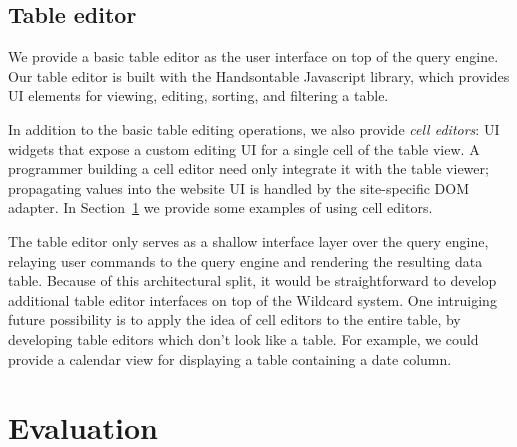 \documentclass[sigplan,screen,10pt,anonymous,review]{acmart}
\begin{document}
\hypertarget{table-editor}{%
\subsection{Table editor}\label{table-editor}}

We provide a basic table editor as the user interface on top of the
query engine. Our table editor is built with the Handsontable Javascript
library, which provides UI elements for viewing, editing, sorting, and
filtering a table.

In addition to the basic table editing operations, we also provide
\emph{cell editors}: UI widgets that expose a custom editing UI for a
single cell of the table view. A programmer building a cell editor need
only integrate it with the table viewer; propagating values into the
website UI is handled by the site-specific DOM adapter. In
Section~\ref{sec:evaluation} we provide some examples of using cell
editors.

The table editor only serves as a shallow interface layer over the query
engine, relaying user commands to the query engine and rendering the
resulting data table. Because of this architectural split, it would be
straightforward to develop additional table editor interfaces on top of
the Wildcard system. One intruiging future possibility is to apply the
idea of cell editors to the entire table, by developing table editors
which don't look like a table. For example, we could provide a calendar
view for displaying a table containing a date column.

\hypertarget{sec:evaluation}{%
\section{Evaluation}\label{sec:evaluation}}
\end{document}
